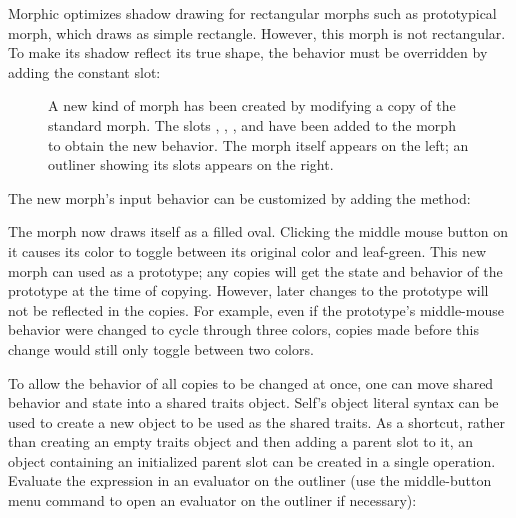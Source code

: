 \documentclass[letterpaper,10pt,english]{sphinxmanual}
\begin{document}
Morphic optimizes shadow drawing for rectangular morphs such as prototypical morph, which draws as simple rectangle. However, this morph is not rectangular. To make its shadow reflect its true shape, the  behavior must be overridden by adding the constant slot:

\begin{sphinxVerbatim}[commandchars=\\\{\}]
  
\end{sphinxVerbatim}
\begin{figure}[htbp]
\centering
\capstart

\noindent{}
\caption{A new kind of morph has been created by modifying a copy of the standard morph. The slots , , , and  have been added to the morph to obtain the new behavior. The morph itself appears on the left; an outliner showing its slots appears on the right.}\label{\detokenize{morphic:id6}}\end{figure}

The new morph's input behavior can be customized by adding the method:

\begin{sphinxVerbatim}[commandchars=\\\{\}]
     
     
     
     
\end{sphinxVerbatim}

The morph now draws itself as a filled oval. Clicking the middle mouse button on it causes its color to toggle between its original color and leaf-green. This new morph can used as a prototype; any copies will get the state and behavior of the prototype at the time of copying. However, later changes to the prototype will not be reflected in the copies. For example, even if the prototype's middle-mouse behavior were changed to cycle through three colors, copies made before this change would still only toggle between two colors.

To allow the behavior of all copies to be changed at once, one can move shared behavior and state into a shared traits object. Self's object literal syntax can be used to create a new object to be used as the shared traits. As a shortcut, rather than creating an empty traits object and then adding a parent slot to it, an object containing an initialized parent slot can be created in a single operation. Evaluate the expression in an evaluator on the outliner (use the middle-button menu command  to open an evaluator on the outliner if necessary):
\end{document}
